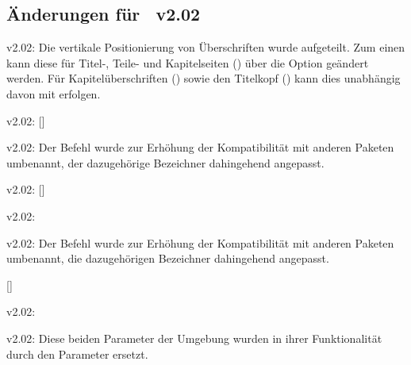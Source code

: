 %
\subsection{Änderungen für \TUDScript~v2.02}
\begin{Obsolete}{v2.02:}{}
\printobsoletelist%
%
Die vertikale Positionierung von Überschriften wurde aufgeteilt. Zum einen kann 
diese für Titel-, Teile- und Kapitelseiten () über die
Option  geändert werden. Für Kapitelüberschriften 
() sowie den Titelkopf () 
kann dies unabhängig davon mit  erfolgen.
\end{Obsolete}

\begin{Obsolete}{v2.02:}{%
  []%
}
\begin{Obsolete}{v2.02:}{}
\printobsoletelist%
%
Der Befehl wurde zur Erhöhung der Kompatibilität mit anderen Paketen umbenannt, 
der dazugehörige Bezeichner dahingehend angepasst.
\end{Obsolete}
\end{Obsolete}

\begin{Obsolete}{v2.02:}{%
  []%
}
\begin{Obsolete}{v2.02:}{}
\begin{Obsolete}{v2.02:}{}
\printobsoletelist%
%
Der Befehl wurde zur Erhöhung der Kompatibilität mit anderen Paketen umbenannt, 
die dazugehörigen Bezeichner dahingehend angepasst.
\end{Obsolete}
\end{Obsolete}
\end{Obsolete}

\begin{Obsolete}{}{[]}
\begin{Obsolete}{v2.02:}{%
}
\begin{Obsolete}{v2.02:}{%
}
\printobsoletelist%
%
Diese beiden Parameter der Umgebung  wurden in ihrer 
Funktionalität durch den Parameter  
ersetzt.
\end{Obsolete}
\end{Obsolete}
\end{Obsolete}



